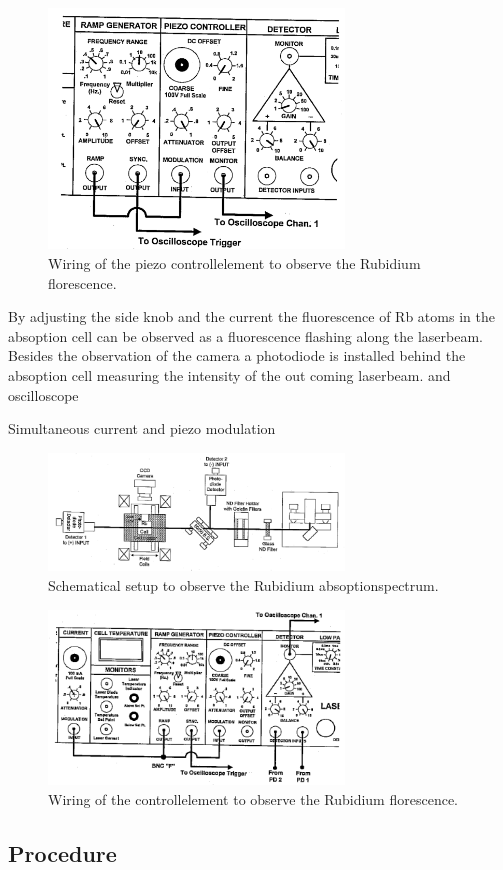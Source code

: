 \begin{figure}
  \centering
  \includegraphics[width=0.7\textwidth]{wiring.png}
  \caption{Wiring of the piezo controllelement to observe the Rubidium florescence.\cite{V61}}
  \label{fig:dl_controll}
\end{figure}

By adjusting the side knob and the current
the fluorescence of Rb atoms in the absoption cell
can be observed
as a fluorescence flashing along the laserbeam.
Besides the observation of the camera a photodiode
is installed behind the absoption cell
measuring the intensity
of the out coming laserbeam.
 and
oscilloscope


Simultaneous current and piezo modulation

\begin{figure}
  \centering
  \includegraphics[width=0.7\textwidth]{setup3.png}
  \caption{Schematical setup to observe the Rubidium absoptionspectrum.\cite{V61}}
  \label{fig:setup3}
\end{figure}


\begin{figure}
  \centering
  \includegraphics[width=0.7\textwidth]{wiring2.png}
  \caption{Wiring of the controllelement to observe the Rubidium florescence.\cite{V61}}
  \label{fig:dl_controll2}
\end{figure}


\subsection{Procedure}
\label{subsec:procedure}
